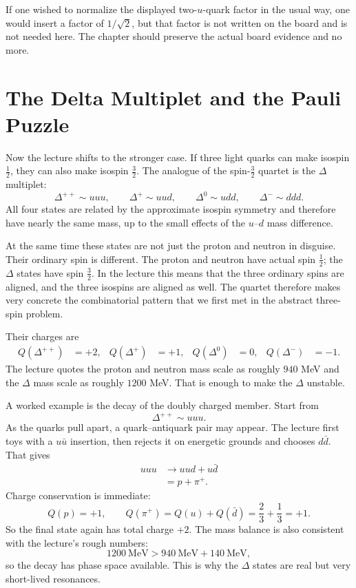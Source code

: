 If one wished to normalize the displayed two-\(u\)-quark factor in the usual way, one would insert a factor of \(1/\sqrt2\), but that factor is not written on the board and is not needed here. The chapter should preserve the actual board evidence and no more.

\section{The Delta Multiplet and the Pauli Puzzle}

Now the lecture shifts to the stronger case. If three light quarks can make isospin \(\tfrac12\), they can also make isospin \(\tfrac32\). The analogue of the spin-\(\tfrac32\) quartet is the \(\Delta\) multiplet:
\begin{equation}
\Delta^{++}\sim uuu,\qquad
\Delta^{+}\sim uud,\qquad
\Delta^{0}\sim udd,\qquad
\Delta^{-}\sim ddd.
\end{equation}
All four states are related by the approximate isospin symmetry and therefore have nearly the same mass, up to the small effects of the \(u\)--\(d\) mass difference.

At the same time these states are not just the proton and neutron in disguise. Their ordinary spin is different. The proton and neutron have actual spin \(\tfrac12\); the \(\Delta\) states have spin \(\tfrac32\). In the lecture this means that the three ordinary spins are aligned, and the three isospins are aligned as well. The quartet therefore makes very concrete the combinatorial pattern that we first met in the abstract three-spin problem.

Their charges are
\begin{align}
Q(\Delta^{++})&=+2, &
Q(\Delta^{+})&=+1, &
Q(\Delta^{0})&=0, &
Q(\Delta^{-})&=-1.
\end{align}
The lecture quotes the proton and neutron mass scale as roughly \(940\) MeV and the \(\Delta\) mass scale as roughly \(1200\) MeV. That is enough to make the \(\Delta\) unstable.

A worked example is the decay of the doubly charged member. Start from
\begin{equation}
\Delta^{++}\sim uuu.
\end{equation}
As the quarks pull apart, a quark--antiquark pair may appear. The lecture first toys with a \(u\bar u\) insertion, then rejects it on energetic grounds and chooses \(d\bar d\). That gives
\begin{align}
uuu &\longrightarrow uud + u\bar d \\
&= p + \pi^+.
\end{align}
Charge conservation is immediate:
\[
Q(p)=+1,
\qquad
Q(\pi^+)=Q(u)+Q(\bar d)=\frac23+\frac13=+1.
\]
So the final state again has total charge \(+2\). The mass balance is also consistent with the lecture's rough numbers:
\[
1200\ \text{MeV} > 940\ \text{MeV}+140\ \text{MeV},
\]
so the decay has phase space available. This is why the \(\Delta\) states are real but very short-lived resonances.

